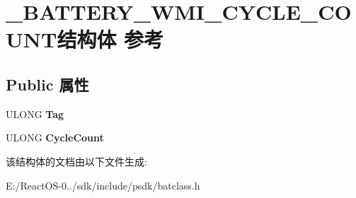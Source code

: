 \hypertarget{struct___b_a_t_t_e_r_y___w_m_i___c_y_c_l_e___c_o_u_n_t}{}\section{\+\_\+\+B\+A\+T\+T\+E\+R\+Y\+\_\+\+W\+M\+I\+\_\+\+C\+Y\+C\+L\+E\+\_\+\+C\+O\+U\+N\+T结构体 参考}
\label{struct___b_a_t_t_e_r_y___w_m_i___c_y_c_l_e___c_o_u_n_t}
\subsection*{Public 属性}
\begin{DoxyCompactItemize}
\item 
\mbox{\label{struct___b_a_t_t_e_r_y___w_m_i___c_y_c_l_e___c_o_u_n_t_a0451a50e607ed209c6e3394a4fcb27ed}} 
U\+L\+O\+NG {\bfseries Tag}
\item 
\mbox{\label{struct___b_a_t_t_e_r_y___w_m_i___c_y_c_l_e___c_o_u_n_t_ac1da90fa97e20cc9f122c23e4578615e}} 
U\+L\+O\+NG {\bfseries Cycle\+Count}
\end{DoxyCompactItemize}


该结构体的文档由以下文件生成\+:\begin{DoxyCompactItemize}
\item 
E\+:/\+React\+O\+S-\/0../sdk/include/psdk/batclass.\+h\end{DoxyCompactItemize}
